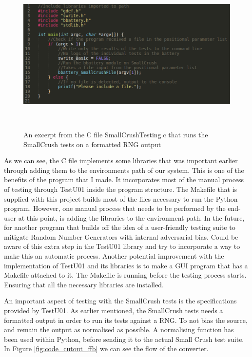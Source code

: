 \documentclass[]{final_report}
\begin{document}
\begin{figure}[h!]
\begin{center}
\includegraphics[height=8cm]{code_cutout_SmallCrush}
\caption{An excerpt from the C file SmallCrushTesting.c that runs the SmallCrush tests on a formatted RNG output}
\label{fig:code_cutout_SmallCrush}
\end{center}
\end{figure}

\par{As we can see, the C file implements some libraries that was important earlier through adding them to the environments path of our system. This is one of the benefits of the program that I made. It incorporates most of the manual process of testing through TestU01 inside the program structure. The Makefile that is supplied with this project builds most of the files necessary to run the Python program. However, one manual process that needs to be performed by the end-user at this point, is adding the libraries to the environment path. In the future, for another program that builds off the idea of a user-friendly testing suite to mitigate Random Number Generators with internal adversarial bias. Could be aware of this extra step in the TestU01 library and try to incorporate a way to make this an automatic process. Another potential improvement with the implementation of TestU01 and its libraries is to make a GUI program that has a Makefile attached to it. The Makefile is running before the testing process starts. Ensuring that all the necessary libraries are installed.}

\par{An important aspect of testing with the SmallCrush tests is the specifications provided by TestU01. As earlier mentioned, the SmallCrush tests needs a formatted output in order to run its tests against a RNG. To not bias the source, and remain the output as normalised as possible. A normalising function has been used within Python, before sending it to the actual Small Crush test suite. In Figure \ref{fig:code_cutout_ffb} we can see the flow of the converter.}
\end{document}
